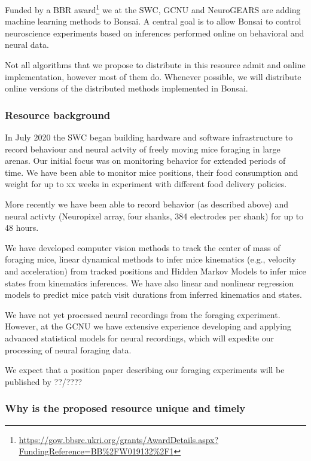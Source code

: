 Funded by a BBR
award\footnote{\url{https://gow.bbsrc.ukri.org/grants/AwardDetails.aspx?FundingReference=BB\%2FW019132\%2F1}}
we at the SWC, GCNU and NeuroGEARS are adding machine learning methods to
Bonsai. A central goal is to allow Bonsai to control neuroscience experiments
based on inferences performed online on behavioral and neural data.

Not all algorithms that we propose to distribute in this resource admit and
online implementation, however most of them do. Whenever possible, we will
distribute online versions of the distributed methods implemented in Bonsai.

\subsubsection*{Resource background}

In July 2020 the SWC began building hardware and software infrastructure to
record behaviour and neural actvity of freely moving mice foraging in large
arenas. Our initial focus was on monitoring behavior for extended periods of
time. We have been able to monitor mice positions, their food consumption and
weight for up to xx weeks in experiment with different food delivery policies.

More recently we have been able to record behavior (as described above) and
neural activty (Neuropixel array, four shanks, 384 electrodes per shank) for up
to 48 hours.

We have developed computer vision methods to track the center of mass of
foraging mice, linear dynamical methods to infer mice kinematics (e.g.,
velocity and acceleration) from tracked positions and Hidden Markov Models to
infer mice states from kinematics inferences.
%
We have also linear and nonlinear regression models to predict mice patch
visit durations from inferred kinematics and states.

We have not yet processed neural recordings from the foraging experiment.
However, at the GCNU we have extensive experience developing and applying
advanced statistical models for neural recordings, which will expedite our
processing of neural foraging data.

We expect that a position paper describing our foraging experiments will be
published by ??/????

\subsubsection*{Why is the proposed resource unique and timely}

